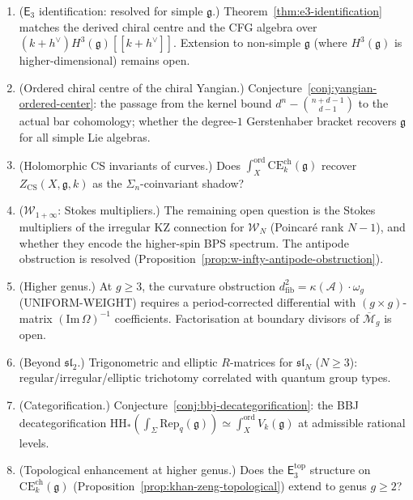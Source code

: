 \documentclass[11pt,reqno]{amsart}
\theoremstyle{definition}
\theoremstyle{remark}
\newcommand{\cA}{\mathcal{A}}
\newcommand{\cM}{\mathcal{M}}
\newcommand{\cW}{\mathcal{W}}
\newcommand{\HH}{\mathrm{HH}}
\newcommand{\CE}{\mathrm{CE}}
\providecommand{\Ethree}{\mathsf{E}_{3}}
\newcommand{\fg}{\mathfrak{g}}
\numberwithin{equation}{section}
\begin{document}
\begin{enumerate}[label=\textup{(\alph*)}]

\item \textup{($\Ethree$ identification: resolved for simple
$\fg$.)}
Theorem~\ref{thm:e3-identification} matches the derived
chiral centre and the CFG algebra over
$(k{+}h^\vee) H^3(\fg)[[k{+}h^\vee]]$. Extension to
non-simple $\fg$ (where $H^3(\fg)$ is higher-dimensional)
remains open.

\item \textup{(Ordered chiral centre of the chiral Yangian.)}
Conjecture~\ref{conj:yangian-ordered-center}: the passage
from the kernel bound $d^n - \binom{n+d-1}{d-1}$ to the
actual bar cohomology; whether the degree-$1$ Gerstenhaber
bracket recovers $\fg$ for all simple Lie algebras.

\item \textup{(Holomorphic CS invariants of curves.)}
Does $\int_X^{\mathrm{ord}} \CE^{\mathrm{ch}}_k(\fg)$
recover $Z_{\mathrm{CS}}(X, \fg, k)$ as the
$\Sigma_n$-coinvariant shadow?

\item \textup{($\cW_{1+\infty}$: Stokes multipliers.)}
The remaining open question is the Stokes multipliers of
the irregular KZ connection for $\cW_N$ (Poincar\'e rank
$N{-}1$), and whether they encode the higher-spin BPS
spectrum. The antipode obstruction is resolved
(Proposition~\ref{prop:w-infty-antipode-obstruction}).

\item \textup{(Higher genus.)}
At $g \geq 3$, the curvature obstruction
$d^2_{\mathrm{fib}} = \kappa(\cA) \cdot \omega_g$
(UNIFORM-WEIGHT) requires a period-corrected differential
with $(g \times g)$-matrix $(\mathrm{Im}\,\Omega)^{-1}$
coefficients. Factorisation at boundary divisors of
$\overline{\cM}_g$ is open.

\item \textup{(Beyond $\mathfrak{sl}_2$.)}
Trigonometric and elliptic $R$-matrices for
$\mathfrak{sl}_N$ ($N \geq 3$): regular/irregular/elliptic
trichotomy correlated with quantum group types.

\item \textup{(Categorification.)}
Conjecture~\ref{conj:bbj-decategorification}: the
BBJ decategorification
$\HH_*(\int_\Sigma \mathrm{Rep}_q(\fg))
\simeq \int_X^{\mathrm{ord}} V_k(\fg)$
at admissible rational levels.

\item \textup{(Topological enhancement at higher genus.)}
Does the $\Ethree^{\mathrm{top}}$ structure on
$\CE^{\mathrm{ch}}_k(\fg)$
(Proposition~\ref{prop:khan-zeng-topological}) extend to
genus $g \geq 2$?

\end{enumerate}
\end{document}
